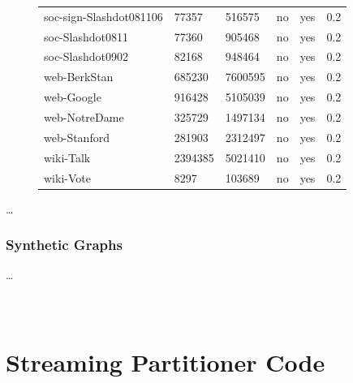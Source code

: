 \documentclass[11pt]{article}
\begin{document}
{\begin{figure}
\begin{tabular}{ *6l }
soc-sign-Slashdot081106 & 77357 & 516575 & no & yes & 0.2\\ 
soc-Slashdot0811 & 77360 & 905468 & no & yes & 0.2\\ 
soc-Slashdot0902 & 82168 & 948464 & no & yes & 0.2\\ 
web-BerkStan & 685230 & 7600595 & no & yes & 0.2\\ 
web-Google & 916428 & 5105039 & no & yes & 0.2\\ 
web-NotreDame & 325729 & 1497134 & no & yes & 0.2\\ 
web-Stanford & 281903 & 2312497 & no & yes & 0.2\\ 
wiki-Talk & 2394385 & 5021410 & no & yes & 0.2\\ 
wiki-Vote  & 8297 & 103689 & no & yes & 0.2\\ 
 \hline
\end{tabular}
\end{figure}\par
}
\dots

\subsubsection{Synthetic Graphs}
\dots




\newpage
\appendix
\section{\\Streaming Partitioner Code} \label{App:AppendixA}
\end{document}
